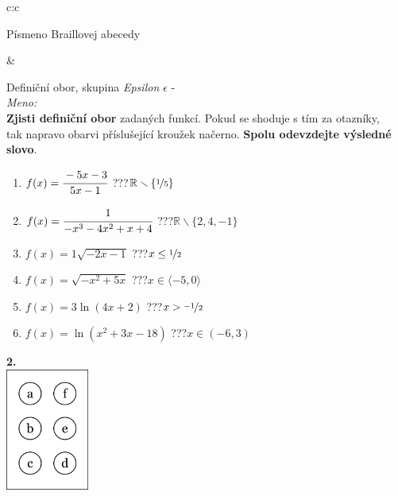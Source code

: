 \documentclass[10pt]{report}
\begin{document}
\begin{tabular}{c:c}
\begin{minipage}[c][99mm][t]{0.49\linewidth}
\begin{center}
\begin{minipage}{0.20\linewidth}
\begin{center}
{\small Písmeno Braillovej abecedy}
\end{center}
\end{minipage}
\end{center}
\end{minipage}
&
\begin{minipage}[c][99mm][t]{0.49\linewidth}
\begin{center}
\vspace{7mm}
{\huge Definiční obor, skupina \textit{Epsilon $\epsilon$} -}\\[4.5mm]
\textit{Meno:}\phantom{xxxxxxxxxxxxxxxxxxxxxxxxxxxxxxxxxxxxxxxxxxxxxxxxxxxxxxxxxxxxxxxxx}\\[3.5mm]
\textbf{Zjisti definiční obor} zadaných funkcí. Pokud se shoduje s tím za otazníky,\\tak napravo obarvi příslušející kroužek načerno. \textbf{Spolu odevzdejte výsledné slovo}.\\[3mm]
\begin{minipage}{0.77\linewidth}
\begin{center}
\begin{varwidth}{\textwidth}
\begin{enumerate}
\normalsize
\item $f(x)=\cfrac{-5x-3}{5x-1}$\quad \dotfill\; ???\;\dotfill \quad $\mathbb{R}\smallsetminus\{\nicefrac{1}{5}\}$
\item $f(x)=\cfrac{1}{-x^3-4x^2+x+4}$\quad \dotfill\; ???\;\dotfill \quad $\mathbb{R}\smallsetminus\{2,4,-1\}$
\item $f(x)=1\sqrt{-2x-1}$\quad \dotfill\; ???\;\dotfill \quad $x\leq\nicefrac{1}{2}$
\item $f(x)=\sqrt{-x^2+5x}$\quad \dotfill\; ???\;\dotfill \quad $x\in\langle-5 , 0\rangle$
\item $f(x)=3\ln{(4x+2)}$\quad \dotfill\; ???\;\dotfill \quad $x>\nicefrac{-1}{2}$
\item $f(x)=\ln{(x^2+3x-18)}$\quad \dotfill\; ???\;\dotfill \quad $x\in(-6 , 3)$
\end{enumerate}
\end{varwidth}
\end{center}
\end{minipage}
\begin{minipage}{0.20\linewidth}
\begin{center}
{\Huge\bfseries 2.} \\[2mm]
\includegraphics[height=40mm]{../images/braille.png}

\end{center}
\end{minipage}
\end{center}
\end{minipage}
\end{tabular}
\end{document}
